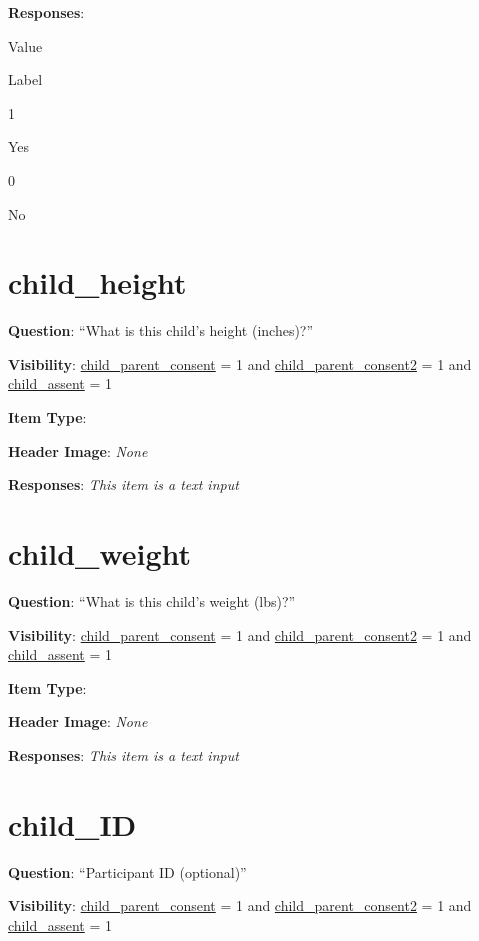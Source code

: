 \documentclass[]{book}
\begin{document}
\textbf{Responses}:

Value

Label

1

Yes

0

No

\hypertarget{child_height}{%
\section{child\_height}\label{child_height}}

\textbf{Question}: ``What is this child's height (inches)?''

\textbf{Visibility}: \protect\hyperlink{child_parent_consent}{child\_parent\_consent} = 1 and \protect\hyperlink{child_parent_consent2}{child\_parent\_consent2} = 1 and \protect\hyperlink{child_assent}{child\_assent} = 1

\textbf{Item Type}:

\textbf{Header Image}: \emph{None}

\textbf{Responses}: \emph{This item is a text input}

\hypertarget{child_weight}{%
\section{child\_weight}\label{child_weight}}

\textbf{Question}: ``What is this child's weight (lbs)?''

\textbf{Visibility}: \protect\hyperlink{child_parent_consent}{child\_parent\_consent} = 1 and \protect\hyperlink{child_parent_consent2}{child\_parent\_consent2} = 1 and \protect\hyperlink{child_assent}{child\_assent} = 1

\textbf{Item Type}:

\textbf{Header Image}: \emph{None}

\textbf{Responses}: \emph{This item is a text input}

\hypertarget{child_id}{%
\section{child\_ID}\label{child_id}}

\textbf{Question}: ``Participant ID (optional)''

\textbf{Visibility}: \protect\hyperlink{child_parent_consent}{child\_parent\_consent} = 1 and \protect\hyperlink{child_parent_consent2}{child\_parent\_consent2} = 1 and \protect\hyperlink{child_assent}{child\_assent} = 1
\end{document}
